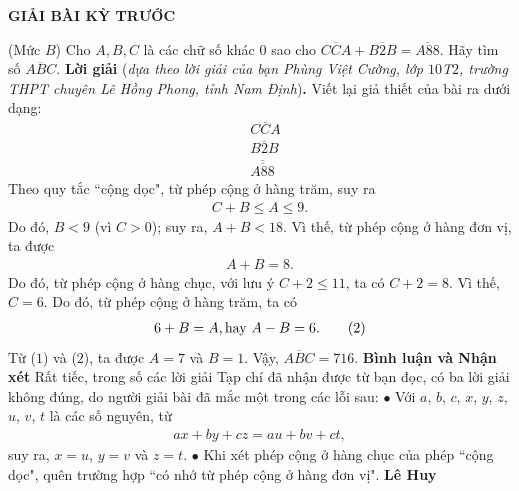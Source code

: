 	\begin{center}
		{\large{\textbf{\color{thachthuctoanhoc}GIẢI BÀI KỲ TRƯỚC}}}
	\end{center}
\begin{multicols}{2}
	\setlength{\abovedisplayskip}{4pt}
	\setlength{\belowdisplayskip}{4pt}
	{}
	(Mức $B$) Cho $A,B,C$ là các chữ số khác $0$ sao cho $\overline{CCA}+\overline{B2B}=\overline{A88}$. Hãy tìm số $\overline{ABC}$.
	\vskip 0.05cm
	\textbf{\color{thachthuctoanhoc}Lời giải} (\textit{dựa theo lời giải của bạn Phùng Việt Cường, lớp $10$T$2$, trường THPT chuyên Lê Hồng Phong, tỉnh Nam Định})\textbf{\color{thachthuctoanhoc}.}
	\vskip 0.05cm
	Viết lại giả thiết của bài ra dưới dạng:
	\begin{align*}
		&\overline{CCA}\\[-0.6ex]
		&\overline{B2B}\\[-0.6ex]
		&\overline{\overline{A88}}
	\end{align*}
	Theo quy tắc ``cộng dọc", từ phép cộng ở hàng trăm, suy ra
	\begin{align*}
		C + B \le A \le 9.
	\end{align*}
	Do đó, $B < 9$ (vì $C > 0$); suy ra, $A + B < 18$. Vì thế, từ phép cộng ở hàng đơn vị, ta được
	\begin{align*}
		A + B = 8. \tag{$1$}
	\end{align*}                                                                  
	Do đó, từ phép cộng ở hàng chục, với lưu ý $C + 2 \le 11$, ta có $C + 2 = 8$. Vì thế, $C = 6$. Do đó, từ phép cộng ở hàng trăm, ta có
	\begin{align*}
		6 + B = A, \text{\color{black} hay }A - B = 6. \tag{$2$}
	\end{align*}
	Từ ($1$) và ($2$), ta được $A = 7$ và $B = 1$.
	\vskip 0.05cm
	Vậy, $\overline {ABC}  = 716$.
	\vskip 0.05cm
	\textbf{\color{thachthuctoanhoc}Bình luận và Nhận xét}
	\vskip 0.05cm
	Rất tiếc, trong số các lời giải Tạp chí đã nhận được từ bạn đọc, có ba lời giải không đúng, do người giải bài đã mắc một trong các lỗi sau:
	\vskip 0.05cm
	$\bullet$  Với $a$, $b$, $c$, $x$, $y$, $z$, $u$, $v$, $t$ là các số nguyên, từ
	\begin{align*}
		ax + by + cz = au + bv + ct,
	\end{align*}
	suy ra, $x = u$, $y = v$ và $z = t$.
	\vskip 0.05cm
	$\bullet$  Khi xét phép cộng ở hàng chục của phép ``cộng dọc", quên trường hợp ``có nhớ từ phép cộng ở hàng đơn vị".
	\vskip 0.05cm
	\hfill	\textbf{\color{thachthuctoanhoc}Lê Huy}

\end{multicols}
